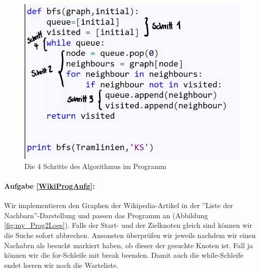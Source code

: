 \begin{figure}[H]
    \centering
    \includegraphics[scale=0.3]{Pictures/Loesung24.jpg}
    \caption{Die 4 Schritte des Algorithmus im Programm}
    \label{fig:ProgLoes}
\end{figure}

\paragraph{Aufgabe \ref{WikiProgAufg}:} Wir implementieren den Graphen der Wikipedia-Artikel in der ''Liste der Nachbarn''-Darstellung und passen das Programm an (Abbildung \ref{fig:my_Prog2Loes}). Falls der Start- und der Zielknoten gleich sind können wir die Suche sofort abbrechen. Ansonsten überprüfen wir jeweils nachdem wir einen Nachabrn als besucht markiert haben, ob dieser der gesuchte Knoten ist. Fall ja können wir die for-Schleife mit break beenden. Damit auch die while-Schleife endet leeren wir noch die Warteliste.

